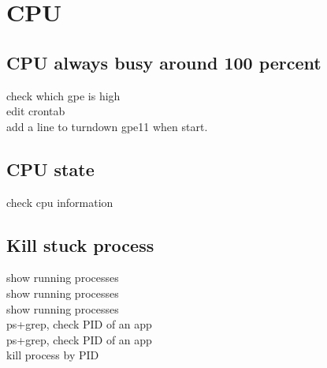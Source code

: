 \chapter{CPU}



\section{CPU always busy around 100 percent}

 check which gpe is high\\
 edit crontab\\
 add a line to turndown gpe11 when start.


\section{CPU state}

 check cpu information

\section{Kill stuck process}

 show running processes\\
 show running processes\\
 show running processes\\
 ps+grep, check PID of an app\\
 ps+grep, check PID of an app\\
 kill process by PID 
